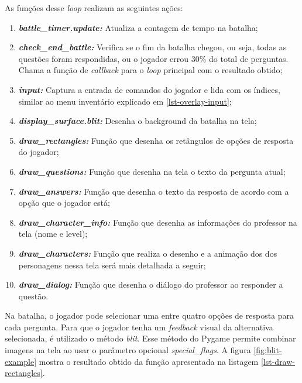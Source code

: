 

As funções desse \textit{loop} realizam as seguintes ações:
\begin{enumerate}
    \item \textit{\textbf{battle\_timer.update:}} Atualiza a contagem de tempo na batalha;
    \item \textbf{\textit{check\_end\_battle:}} Verifica se o fim da batalha chegou, ou seja, todas as questões foram respondidas, ou o jogador errou 30\% do total de perguntas. Chama a função de \textit{callback} para o \textit{loop} principal com o resultado obtido;
    \item \textbf{\textit{input: }} Captura a entrada de comandos do jogador e lida com os índices, similar ao menu inventário explicado em \ref{lst-overlay-input};
    \item \textbf{\textit{display\_surface.blit:}} Desenha o background da batalha na tela;
    \item \textbf{\textit{draw\_rectangles:}} Função que desenha os retângulos de opções de resposta do jogador;
    \item \textbf{\textit{draw\_questions:}} Função que desenha na tela o texto da pergunta atual;
    \item \textbf{\textit{draw\_answers:}} Função que desenha o texto da resposta de acordo com a opção que o jogador está;
    \item \textbf{\textit{draw\_character\_info:}} Função que desenha as informações do professor na tela (nome e level);
    \item \textbf{\textit{draw\_characters:}} Função que realiza o desenho e a animação dos dos personagens nessa tela será mais detalhada a seguir;
    \item \textbf{\textit{draw\_dialog:}} Função que desenha o diálogo do professor ao responder a questão.
\end{enumerate}
\clearpage

Na batalha, o jogador pode selecionar uma entre quatro opções de resposta para cada pergunta. Para que o jogador tenha um \textit{feedback} visual da alternativa selecionada, é utilizado o método \textit{blit}. Esse método do Pygame permite combinar imagens na tela ao usar o parâmetro opcional \textit{special\_flags}. A figura \ref{fig:blit-example} mostra o resultado obtido da função apresentada na listagem \ref{lst-draw-rectangles}.


